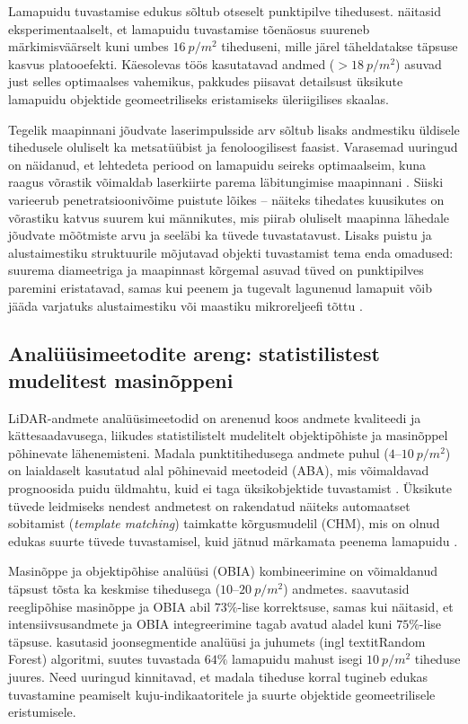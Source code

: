 Lamapuidu tuvastamise edukus sõltub otseselt punktipilve tihedusest. \textcite{joyce_detection_2019} näitasid eksperimentaalselt, et lamapuidu tuvastamise tõenäosus suureneb märkimisväärselt kuni umbes $16~p/m^2$ tiheduseni, mille järel täheldatakse täpsuse kasvus platooefekti. Käesolevas töös kasutatavad andmed ($>18~p/m^2$) asuvad just selles optimaalses vahemikus, pakkudes piisavat detailsust üksikute lamapuidu objektide geomeetriliseks eristamiseks üleriigilises skaalas.

Tegelik maapinnani jõudvate laserimpulsside arv sõltub lisaks andmestiku üldisele tihedusele oluliselt ka metsatüübist ja fenoloogilisest faasist. Varasemad uuringud on näidanud, et lehtedeta periood on lamapuidu seireks optimaalseim, kuna raagus võrastik võimaldab laserkiirte parema läbitungimise maapinnani \parencite{marchi_airborne_2018}. Siiski varieerub penetratsioonivõime puistute lõikes – näiteks tihedates kuusikutes on võrastiku katvus suurem kui männikutes, mis piirab oluliselt maapinna lähedale jõudvate mõõtmiste arvu ja seeläbi ka tüvede tuvastatavust. Lisaks puistu ja alustaimestiku struktuurile mõjutavad objekti tuvastamist tema enda omadused: suurema diameetriga ja maapinnast kõrgemal asuvad tüved on punktipilves paremini eristatavad, samas kui peenem ja tugevalt lagunenud lamapuit võib jääda varjatuks alustaimestiku või maastiku mikroreljeefi tõttu \parencite{heinaro_airborne_2021, shin_morphological_2024}.

\subsection{Analüüsimeetodite areng: statistilistest mudelitest masinõppeni}

LiDAR-andmete analüüsimeetodid on arenenud koos andmete kvaliteedi ja kättesaadavusega, liikudes statistilistelt mudelitelt objektipõhiste ja masinõppel põhinevate lähenemisteni. Madala punktitihedusega andmete puhul ($4$--$10~p/m^2$) on laialdaselt kasutatud alal põhinevaid meetodeid (ABA), mis võimaldavad prognoosida puidu üldmahtu, kuid ei taga üksikobjektide tuvastamist \parencite{pesonen_airborne_2008}. Üksikute tüvede leidmiseks nendest andmetest on rakendatud näiteks automaatset sobitamist (\textit{template matching}) taimkatte kõrgusmudelil (CHM), mis on olnud edukas suurte tüvede tuvastamisel, kuid jätnud märkamata peenema lamapuidu \parencite{lindberg_detection_2013}.

Masinõppe ja objektipõhise analüüsi (OBIA) kombineerimine on võimaldanud täpsust tõsta ka keskmise tihedusega ($10$--$20~p/m^2$) andmetes. \textcite{blanchard_object-based_2011} saavutasid reeglipõhise masinõppe ja OBIA abil $73\%$-lise korrektsuse, samas kui \textcite{mucke_comparison_2013} näitasid, et intensiivsusandmete ja OBIA integreerimine tagab avatud aladel kuni $75\%$-lise täpsuse. \textcite{nystrom_detection_2014} kasutasid joonsegmentide analüüsi ja juhumets (ingl textit{Random Forest}) algoritmi, suutes tuvastada $64\%$ lamapuidu mahust isegi $10~p/m^2$ tiheduse juures. Need uuringud kinnitavad, et madala tiheduse korral tugineb edukas tuvastamine peamiselt kuju-indikaatoritele ja suurte objektide geomeetrilisele eristumisele. 

